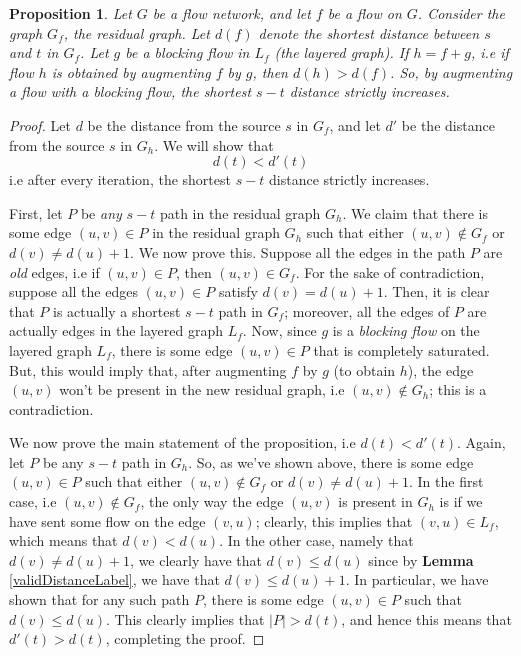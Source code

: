 \documentclass[12pt,a4paper]{amsart}
\numberwithin{equation}{section}
\newtheorem{Prop}[Th]{Proposition}
\theoremstyle{definition}
\begin{document}
\begin{Prop}
	Let $G$ be a flow network, and let $f$ be a flow on $G$. Consider the graph $G_f$, the residual graph. Let $d(f)$ denote the shortest distance between $s$ and $t$ in $G_f$. Let $g$ be a blocking flow in $L_f$ (the layered graph). If $h = f + g$, i.e if flow $h$ is obtained by augmenting $f$ by $g$, then $d(h) > d(f)$. So, by augmenting a flow with a blocking flow, the shortest $s-t$ distance strictly increases.
\end{Prop}
\begin{proof}
 	Let $d$ be the distance from the source $s$ in $G_f$, and let $d'$ be the distance from the source $s$ in $G_h$. We will show that  
	$$d(t) < d'(t)$$
	i.e after every iteration, the shortest $s-t$ distance strictly increases. 
	
	First, let $P$ be \textit{any} $s-t$ path in the residual graph $G_h$. We claim that there is some edge $(u, v)\in P$ in the residual graph $G_h$ such that either $(u, v)\notin G_f$ or $d(v)\ne d(u) + 1$. We now prove this. Suppose all the edges in the path $P$ are \textit{old} edges, i.e if $(u, v)\in P$, then $(u, v)\in G_f$. For the sake of contradiction, suppose all the edges $(u, v)\in P$ satisfy $d(v) = d(u) + 1$. Then, it is clear that $P$ is actually a shortest $s-t$ path in $G_f$; moreover, all the edges of $P$ are actually edges in the layered graph $L_f$. Now, since $g$ is a \textit{blocking flow} on the layered graph $L_f$, there is some edge $(u, v)\in P$ that is completely saturated. But, this would imply that, after augmenting $f$ by $g$ (to obtain $h$), the edge $(u, v)$ won't be present in the new residual graph, i.e $(u, v)\notin G_h$; this is a contradiction.
	
	We now prove the main statement of the proposition, i.e $d(t) < d'(t)$. Again, let $P$ be any $s-t$ path in $G_h$. So, as we've shown above, there is some edge $(u, v)\in P$ such that either $(u, v)\notin G_f$ or $d(v)\ne d(u) + 1$. In the first case, i.e $(u, v)\notin G_f$, the only way the edge $(u, v)$ is present in $G_h$ is if we have sent some flow on the edge $(v, u)$; clearly, this implies that $(v, u)\in L_f$, which means that $d(v) < d(u)$. In the other case, namely that $d(v)\ne d(u) + 1$, we clearly have that $d(v)\le d(u)$ since by \textbf{Lemma} \ref{validDistanceLabel}, we have that $d(v)\le d(u) + 1$. In particular, we have shown that for any such path $P$, there is some edge $(u, v)\in P$ such that $d(v)\le d(u)$. This clearly implies that $|P| > d(t)$, and hence this means that $d'(t) > d(t)$, completing the proof. 
\end{proof}
\end{document}
